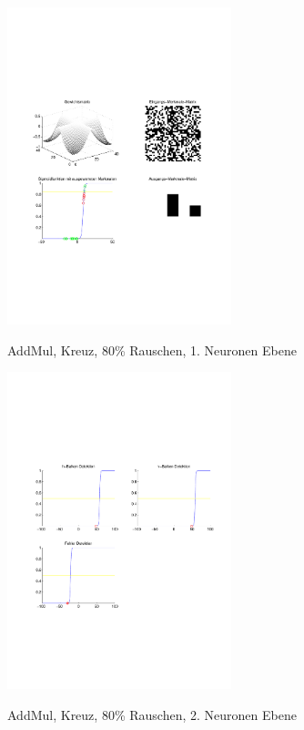 \begin{figure}[hbt]
	\begin{minipage}[c]{\textwidth}
		\centering
       	\includegraphics[trim=71 213 43 212, clip, width=0.58\textwidth]{./Bilder/Auswertung/Endergebnis/TypeAddMul_Rauschen80_Cross_Layer1}
		\caption{AddMul, Kreuz, 80\% Rauschen, 1. Neuronen Ebene}
		\label{AddMul_Kreuz_80_1}
		\vfill
		\includegraphics[trim=71 213 43 212, clip, width=0.58\textwidth]{./Bilder/Auswertung/Endergebnis/TypeAddMul_Rauschen80_Cross_Layer2}
		\caption{AddMul, Kreuz, 80\% Rauschen, 2. Neuronen Ebene}
		\label{AddMul_Kreuz_80_2}
	\end{minipage}
\end{figure}
\clearpage

